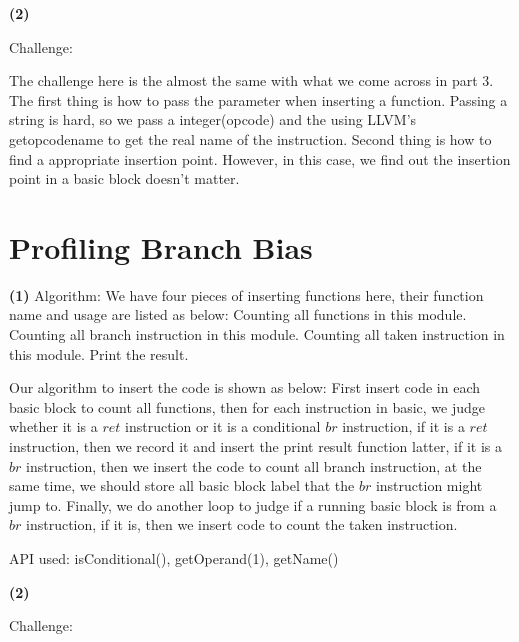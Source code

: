 \documentclass{article}
\renewcommand{\part}[1] {\vspace{.10in} {\bf (#1)}}
\begin{document}
\part{2}

Challenge:

The challenge here is the almost the same with what we come across in part 3. The first thing is how to pass the parameter when inserting a function. Passing a string is hard, so we pass a integer(opcode) and the using LLVM's getopcodename to get the real name of the instruction. Second thing is how to find a appropriate insertion point. However, in this case, we find out the insertion point in a basic block doesn't matter.


\section{Profiling Branch Bias}


\part{1} Algorithm:
We have four pieces of inserting functions here, their function name and usage are listed as below:
Counting all functions in this module.
Counting all branch instruction in this module.
Counting all taken instruction in this module.
Print the result.

Our algorithm to insert the code is shown as below: First insert code in each basic block to count all functions, then for each instruction in basic, we judge whether it is a $ret$ instruction or it is a conditional $br$ instruction, if it is a $ret$ instruction, then we record it and insert the print result function latter, if it is a $br$ instruction, then we insert the code to count all branch instruction, at the same time, we should store all basic block label that the $br$ instruction might jump to. Finally, we do another loop to judge if a running basic block is from a $br$ instruction, if it is, then we insert code to count the taken instruction.



API used:
isConditional(),
getOperand(1),
getName()


\part{2}

Challenge:
\end{document}
